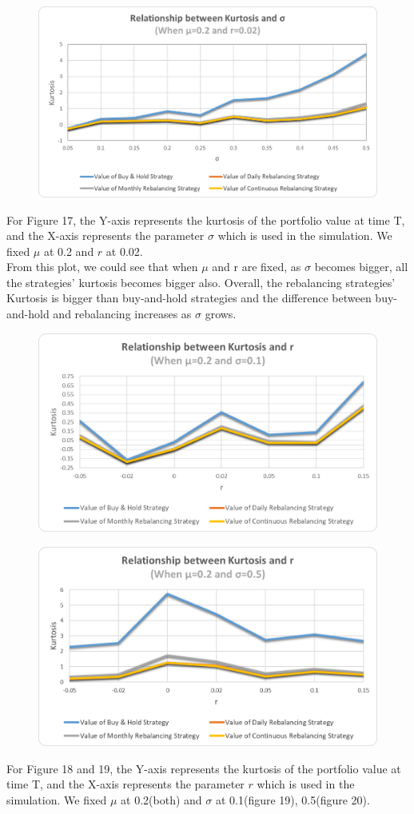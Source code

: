 \documentclass[
10pt, %
a4paper, %
oneside, %
headinclude,footinclude, %
BCOR5mm, %
]{scrartcl}
\begin{document}
\begin{figure}[H]
	\centering
	\includegraphics[width=0.7\linewidth]{Kurto_sigma_020_002}
	\caption{}
	\label{fig:kurtosigma020002}
\end{figure}
For Figure 17, the Y-axis represents the kurtosis of the portfolio value at time T, and the X-axis represents the parameter $\sigma$ which is used in the simulation. We fixed $\mu$ at 0.2 and $r$ at 0.02.\\

From this plot, we could see that when $\mu$ and r are fixed, as $\sigma$ becomes bigger, all the strategies' kurtosis becomes bigger also. Overall, the rebalancing strategies’ Kurtosis is bigger than buy-and-hold strategies and the difference between buy-and-hold and rebalancing increases as $\sigma$ grows.\\
\begin{figure}[H]
	\centering
	\includegraphics[width=0.7\linewidth]{Kurto_r_020_010}
	\caption{}
	\label{fig:kurtor020010}
\end{figure}


\begin{figure}[H]
	\centering
	\includegraphics[width=0.7\linewidth]{Kurto_r_020_050}
	\caption{}
	\label{fig:kurtor020050}
\end{figure}
For Figure 18 and 19, the Y-axis represents the kurtosis of the portfolio value at time T, and the X-axis represents the parameter $r$ which is used in the simulation. We fixed $\mu$ at 0.2(both) and $\sigma$ at 0.1(figure 19), 0.5(figure 20).\\
\end{document}
